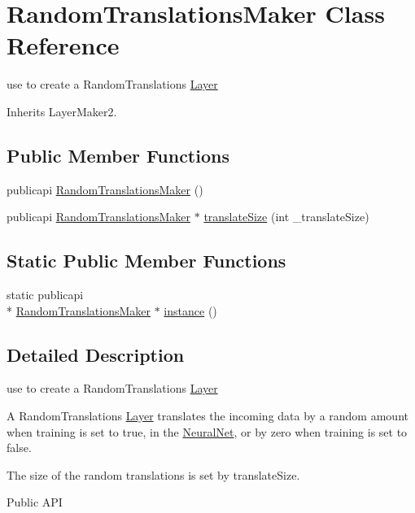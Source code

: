 \hypertarget{classRandomTranslationsMaker}{\section{Random\-Translations\-Maker Class Reference}
\label{classRandomTranslationsMaker}
}


use to create a Random\-Translations \hyperlink{classLayer}{Layer}  




Inherits Layer\-Maker2.

\subsection*{Public Member Functions}
\begin{DoxyCompactItemize}
\item 
publicapi \hyperlink{classRandomTranslationsMaker_a1dc31c5a5846cb6d98a75ec7da4daea1}{Random\-Translations\-Maker} ()
\item 
publicapi \hyperlink{classRandomTranslationsMaker}{Random\-Translations\-Maker} $\ast$ \hyperlink{classRandomTranslationsMaker_a66bf571e71001ce41a08fd80ed328920}{translate\-Size} (int \-\_\-translate\-Size)
\end{DoxyCompactItemize}
\subsection*{Static Public Member Functions}
\begin{DoxyCompactItemize}
\item 
static publicapi \\*
\hyperlink{classRandomTranslationsMaker}{Random\-Translations\-Maker} $\ast$ \hyperlink{classRandomTranslationsMaker_a69ccda5923d035f84bd0830489459d81}{instance} ()
\end{DoxyCompactItemize}


\subsection{Detailed Description}
use to create a Random\-Translations \hyperlink{classLayer}{Layer} 

A Random\-Translations \hyperlink{classLayer}{Layer} translates the incoming data by a random amount when training is set to true, in the \hyperlink{classNeuralNet}{Neural\-Net}, or by zero when training is set to false.

The size of the random translations is set by translate\-Size. \begin{DoxyParagraph}{Public A\-P\-I}

\end{DoxyParagraph}



